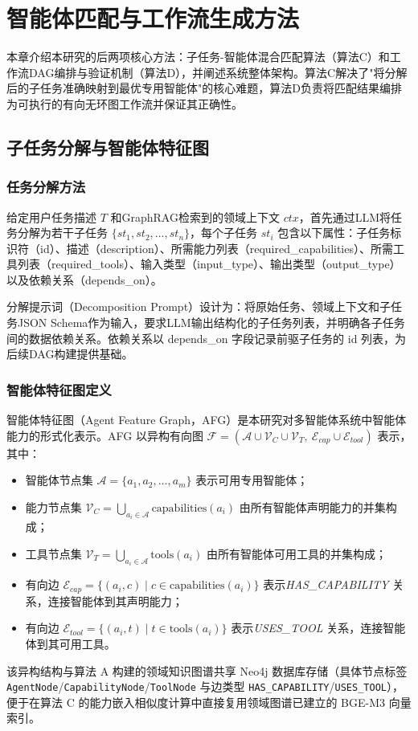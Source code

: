 \section{智能体匹配与工作流生成方法}

本章介绍本研究的后两项核心方法：子任务-智能体混合匹配算法（算法C）和工作流DAG编排与验证机制（算法D），并阐述系统整体架构。算法C解决了"将分解后的子任务准确映射到最优专用智能体"的核心难题，算法D负责将匹配结果编排为可执行的有向无环图工作流并保证其正确性。

\subsection{子任务分解与智能体特征图}

\subsubsection{任务分解方法}

给定用户任务描述 $T$ 和GraphRAG检索到的领域上下文 $ctx$，首先通过LLM将任务分解为若干子任务 $\{st_1, st_2, \ldots, st_n\}$，每个子任务 $st_i$ 包含以下属性：子任务标识符（id）、描述（description）、所需能力列表（required\_capabilities）、所需工具列表（required\_tools）、输入类型（input\_type）、输出类型（output\_type）以及依赖关系（depends\_on）。

分解提示词（Decomposition Prompt）设计为：将原始任务、领域上下文和子任务JSON Schema作为输入，要求LLM输出结构化的子任务列表，并明确各子任务间的数据依赖关系。依赖关系以 depends\_on 字段记录前驱子任务的 id 列表，为后续DAG构建提供基础。

\subsubsection{智能体特征图定义}

智能体特征图（Agent Feature Graph，AFG）是本研究对多智能体系统中智能体能力的形式化表示。AFG 以异构有向图 $\mathcal{F} = (\mathcal{A} \cup \mathcal{V}_C \cup \mathcal{V}_T,\ \mathcal{E}_{cap} \cup \mathcal{E}_{tool})$ 表示，其中：
\begin{itemize}
    \item 智能体节点集 $\mathcal{A} = \{a_1, a_2, \ldots, a_m\}$ 表示可用专用智能体；
    \item 能力节点集 $\mathcal{V}_C = \bigcup_{a_i \in \mathcal{A}} \text{capabilities}(a_i)$ 由所有智能体声明能力的并集构成；
    \item 工具节点集 $\mathcal{V}_T = \bigcup_{a_i \in \mathcal{A}} \text{tools}(a_i)$ 由所有智能体可用工具的并集构成；
    \item 有向边 $\mathcal{E}_{cap} = \{(a_i, c) \mid c \in \text{capabilities}(a_i)\}$ 表示\emph{HAS\_CAPABILITY} 关系，连接智能体到其声明能力；
    \item 有向边 $\mathcal{E}_{tool} = \{(a_i, t) \mid t \in \text{tools}(a_i)\}$ 表示\emph{USES\_TOOL} 关系，连接智能体到其可用工具。
\end{itemize}
该异构结构与算法 A 构建的领域知识图谱共享 Neo4j 数据库存储（具体节点标签 \texttt{AgentNode}/\texttt{CapabilityNode}/\texttt{ToolNode} 与边类型 \texttt{HAS\_CAPABILITY}/\texttt{USES\_TOOL}），便于在算法 C 的能力嵌入相似度计算中直接复用领域图谱已建立的 BGE-M3 向量索引。

